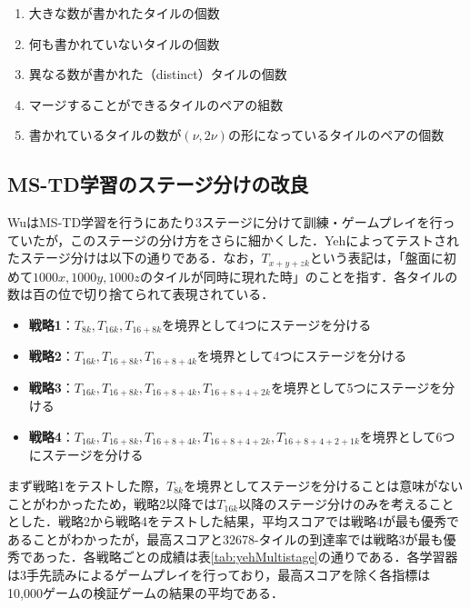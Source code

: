 \documentclass{suribt}
\begin{document}
\begin{enumerate}
\item 大きな数が書かれたタイルの個数
\item 何も書かれていないタイルの個数
\item 異なる数が書かれた（distinct）タイルの個数
\item マージすることができるタイルのペアの組数
\item 書かれているタイルの数が$({\nu}, 2{\nu})$の形になっているタイルのペアの個数
\end{enumerate}

\subsection{MS-TD学習のステージ分けの改良}
WuはMS-TD学習を行うにあたり3ステージに分けて訓練・ゲームプレイを行っていたが，このステージの分け方をさらに細かくした．Yehによってテストされたステージ分けは以下の通りである．なお，$T_{x+y+zk}$という表記は，「盤面に初めて$1000x, 1000y, 1000z$のタイルが同時に現れた時」のことを指す．各タイルの数は百の位で切り捨てられて表現されている．

\begin{itemize}
\item \textbf{戦略1}：$T_{8k}, T_{16k}, T_{16+8k}$を境界として4つにステージを分ける
\item \textbf{戦略2}：$T_{16k}, T_{16+8k}, T_{16+8+4k}$を境界として4つにステージを分ける
\item \textbf{戦略3}：$T_{16k}, T_{16+8k}, T_{16+8+4k}, T_{16+8+4+2k}$を境界として5つにステージを分ける
\item \textbf{戦略4}：$T_{16k}, T_{16+8k}, T_{16+8+4k}, T_{16+8+4+2k}, T_{16+8+4+2+1k}$を境界として6つにステージを分ける
\end{itemize}

まず戦略1をテストした際，$T_{8k}$を境界としてステージを分けることは意味がないことがわかったため，戦略2以降では$T_{16k}$以降のステージ分けのみを考えることとした．戦略2から戦略4をテストした結果，平均スコアでは戦略4が最も優秀であることがわかったが，最高スコアと32678-タイルの到達率では戦略3が最も優秀であった．各戦略ごとの成績は表\ref{tab:yehMultistage}の通りである．各学習器は3手先読みによるゲームプレイを行っており，最高スコアを除く各指標は10,000ゲームの検証ゲームの結果の平均である．
\end{document}
